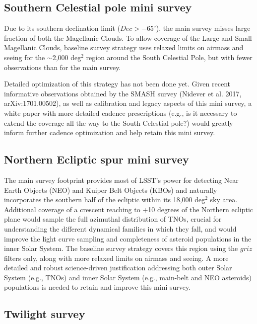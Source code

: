 \documentclass[DM,lsstdraft,toc,usenatbib]{lsstdoc}
\begin{document}
\subsection{Southern Celestial pole mini survey}

Due to its southern declination limit ($Dec > -65^\circ$), the main survey misses large fraction
of both the Magellanic Clouds. To allow coverage of the Large and Small Magellanic Clouds, 
baseline survey strategy uses relaxed limits on airmass and seeing for the $\sim$2,000 deg$^2$ region 
around the South Celestial Pole, but with fewer observations than for the main survey. 

Detailed optimization of this strategy has not been done yet. Given recent informative observations 
obtained by the SMASH survey (Nidever et al. 2017, arXiv:1701.00502), as well as calibration 
and legacy aspects of this mini survey, a white paper with more detailed cadence prescriptions
(e.g., is it necessary to extend the coverage all the way to the South Celestial pole?) would greatly 
inform further cadence optimization and help retain this mini survey. 


\subsection{Northern Ecliptic spur mini survey}

The main survey footprint provides most of LSST's power for detecting Near Earth Objects (NEO) and 
Kuiper Belt Objects (KBOs) and naturally incorporates the southern half of the ecliptic within its 
18,000 deg$^2$ sky area. Additional coverage of a crescent reaching to +10 degrees of the Northern ecliptic 
plane would sample the full azimuthal distribution of TNOs, crucial for understanding the different 
dynamical families in which they fall, and would improve the light curve sampling and completeness
of asteroid populations in the inner Solar System. The baseline survey strategy covers this region using the 
$griz$ filters only, along with more relaxed limits on airmass and seeing. A more detailed 
and robust science-driven justification addressing both outer Solar System (e.g., TNOs) and inner Solar
System (e.g., main-belt and NEO asteroids) populations is needed to retain and improve this mini survey. 


\subsection{Twilight survey \label{sec:twilight}} 
\end{document}
